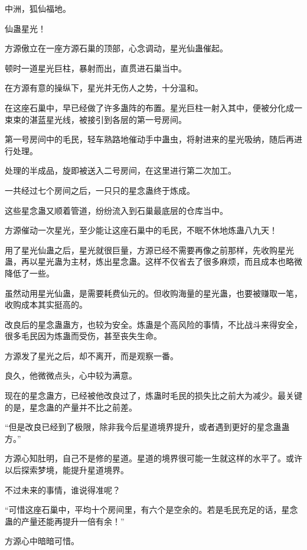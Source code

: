 
\begin{this_body}

中洲，狐仙福地。

仙蛊星光！

方源傲立在一座方源石巢的顶部，心念调动，星光仙蛊催起。

顿时一道星光巨柱，暴射而出，直贯进石巢当中。

在方源有意的操纵下，星光并无伤人之势，十分温和。

在这座石巢中，早已经做了许多蛊阵的布置。星光巨柱一射入其中，便被分化成一束束的湛蓝星光线，被接引到各层的第一号房间。

第一号房间中的毛民，轻车熟路地催动手中蛊虫，将射进来的星光吸纳，随后再进行处理。

处理的半成品，旋即被送入二号房间，在这里进行第二次加工。

一共经过七个房间之后，一只只的星念蛊终于炼成。

这些星念蛊又顺着管道，纷纷流入到石巢最底层的仓库当中。

方源催动一次星光，至少能让这座石巢中的毛民，不眠不休地炼蛊八九天！

用了星光仙蛊之后，星光就很巨量，方源已经不需要再像之前那样，先收购星光蛊，再以星光蛊为主材，炼出星念蛊。这样不仅省去了很多麻烦，而且成本也略微降低了一些。

虽然动用星光仙蛊，是需要耗费仙元的。但收购海量的星光蛊，也要被赚取一笔，收购成本其实挺高的。

改良后的星念蛊蛊方，也较为安全。炼蛊是个高风险的事情，不比战斗来得安全，很多毛民因为炼蛊而受伤，甚至丧失生命。

方源发了星光之后，却不离开，而是观察一番。

良久，他微微点头，心中较为满意。

现在的星念蛊方，已经被他改良过了，炼蛊时毛民的损失比之前大为减少。最关键的是，星念蛊的产量并不比之前差。

“但是改良已经到了极限，除非我今后星道境界提升，或者遇到更好的星念蛊蛊方。”

方源心知肚明，自己不是修的星道。星道的境界很可能一生就这样的水平了。或许以后探索梦境，能提升星道境界。

不过未来的事情，谁说得准呢？

“可惜这座石巢中，平均十个房间里，有六个是空余的。若是毛民充足的话，星念蛊的产量还能再提升一倍有余！”

方源心中暗暗可惜。


\end{this_body}
